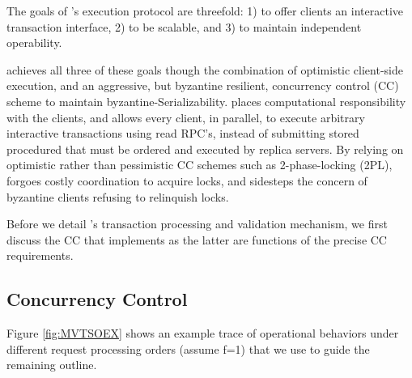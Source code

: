 
The goals of \sys{}'s execution protocol are threefold: 1) to offer clients an interactive transaction interface, 2) to be scalable, and 3) to maintain independent operability.

\sys{} achieves all three of these goals though the combination of optimistic client-side execution, and an aggressive, but byzantine resilient, concurrency control (CC) scheme to maintain byzantine-Serializability. 
\sys places computational responsibility with the clients, and allows every client, in parallel, to execute arbitrary interactive transactions using read RPC's, instead of submitting stored procedured that must be ordered and executed by replica servers.
By relying on optimistic rather than pessimistic CC schemes such as 2-phase-locking (2PL), \sys{} forgoes costly coordination to acquire locks, and sidesteps the concern of byzantine clients refusing to relinquish locks. 

Before we detail \sys{}'s transaction processing and validation mechanism, we first discuss the CC that \sys implements as the latter are functions of the precise CC requirements. 
 
\subsection{Concurrency Control}

Figure \ref{fig:MVTSOEX} shows an example trace of \sys operational behaviors under different request processing orders (assume f=1) that we use to guide the remaining outline.

